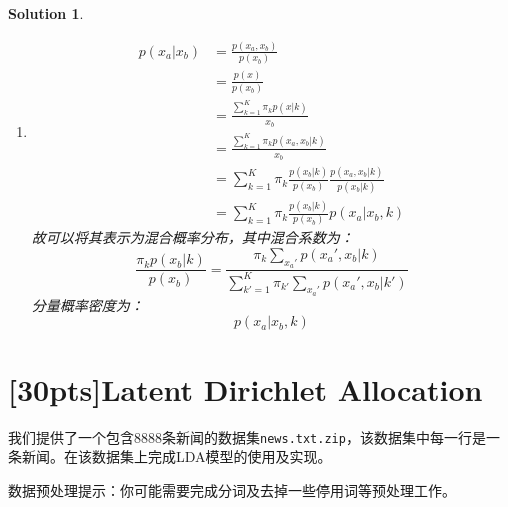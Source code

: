 \documentclass[a4paper,UTF8]{article}
\newtheorem*{solution}{Solution}
\numberwithin{equation}{section}
\begin{document}
\begin{solution}
\begin{enumerate}
所以$$\pi_k=\frac{N_k}{N}$$

\item 
\begin{equation*}
\begin{split}
	p(x_a|x_b) &= \frac{p(x_a,x_b)}{p(x_b)}\\
	&=\frac{p(x)}{p(x_b)}\\
	&=\frac{\sum_{k=1}^K\pi_kp(x|k)}{x_b}\\
	&=\frac{\sum_{k=1}^K\pi_kp(x_a,x_b|k)}{x_b}\\
	&=\sum_{k=1}^K\pi_k \frac{p(x_b|k)}{p(x_b)}\frac{p(x_a,x_b|k)}{p(x_b|k)}\\
	&=\sum_{k=1}^K\pi_k \frac{p(x_b|k)}{p(x_b)}p(x_a|x_b,k)
\end{split}	
\end{equation*}
故可以将其表示为混合概率分布，其中混合系数为：
$$\frac{\pi_kp(x_b|k)}{p(x_b)}=\frac{\pi_k\sum_{x_a'}p(x_a',x_b|k)}{\sum_{k'=1}^K\pi_{k'}\sum_{x_a'}p(x_a',x_b|k')}$$
分量概率密度为：
$$p(x_a|x_b,k)$$
\end{enumerate}
\end{solution}

\section{\textbf{[30pts]}Latent Dirichlet Allocation}
我们提供了一个包含$8888$条新闻的数据集\texttt{news.txt.zip}，该数据集中每一行是一条新闻。在该数据集上完成LDA模型的使用及实现。

数据预处理提示：你可能需要完成分词及去掉一些停用词等预处理工作。
\end{document}
